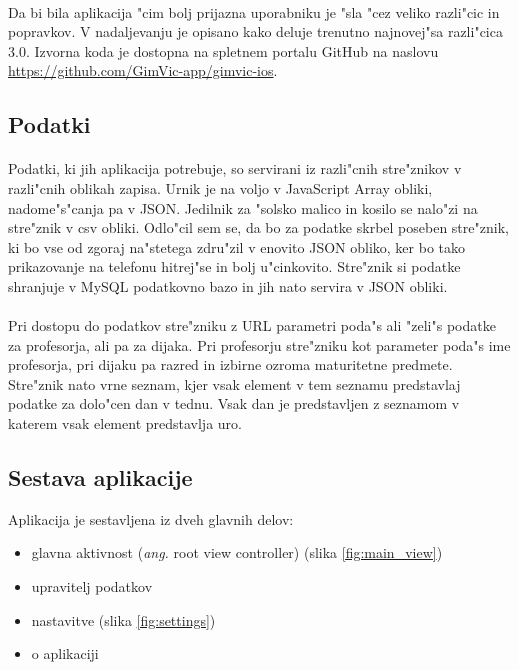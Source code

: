 \paragraph{}Da bi bila aplikacija "cim bolj prijazna uporabniku je "sla "cez veliko razli"cic in popravkov. V nadaljevanju je opisano kako deluje trenutno najnovej"sa razli"cica 3.0. Izvorna koda je dostopna na spletnem portalu GitHub na naslovu \url{https://github.com/GimVic-app/gimvic-ios}.

\subsection{Podatki} 
\paragraph{}Podatki, ki jih aplikacija potrebuje, so servirani iz razli"cnih stre"znikov v razli"cnih oblikah zapisa. Urnik je na voljo v JavaScript Array\cite{js-array} obliki, nadome"s"canja pa v JSON\cite{json-wiki}. Jedilnik za "solsko malico in kosilo se nalo"zi na stre"znik v csv\cite{csv-wiki} obliki. Odlo"cil sem se, da bo za podatke skrbel poseben stre"znik, ki bo vse od zgoraj na"stetega zdru"zil v enovito JSON obliko, ker bo tako prikazovanje na telefonu hitrej"se in bolj u"cinkovito. Stre"znik si podatke shranjuje v MySQL\cite{mysql-wiki} podatkovno bazo\cite{rin} in jih nato servira v JSON obliki.

\paragraph{}Pri dostopu do podatkov stre"zniku z URL parametri\cite{query-string-wiki} poda"s ali "zeli"s podatke za profesorja, ali pa za dijaka. Pri profesorju stre"zniku kot parameter poda"s ime profesorja, pri dijaku pa razred in izbirne ozroma maturitetne predmete. Stre"znik nato vrne seznam, kjer vsak element v tem seznamu predstavlaj podatke za dolo"cen dan v tednu. Vsak dan je predstavljen z seznamom v katerem vsak element predstavlja uro.

\newpage
\subsection{Sestava aplikacije}
Aplikacija je sestavljena iz dveh glavnih delov:
\begin{itemize}
	\setlength\itemsep{0em}
	\item glavna aktivnost (\textit{ang.} root view controller) (slika \ref{fig:main_view})
	\item upravitelj podatkov
	\item nastavitve (slika \ref{fig:settings})
	\item o aplikaciji
\end{itemize}

